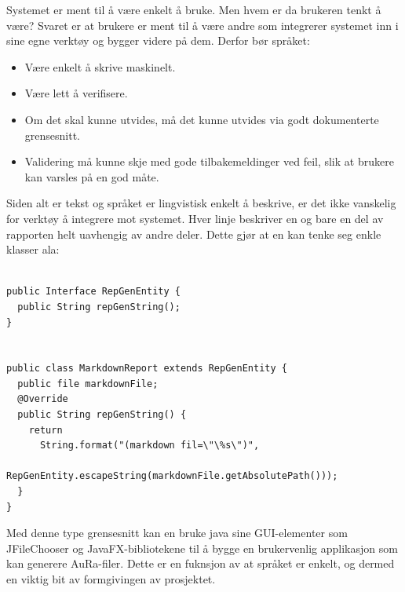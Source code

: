 \documentclass[norsk, 11pt, a4paper]{article}
\begin{document}
Systemet er ment til å være enkelt å bruke. Men hvem er da brukeren tenkt å være?
Svaret er at brukere er ment til å være andre som integrerer systemet inn i sine egne verktøy og bygger videre på dem.
Derfor bør språket:

\begin{itemize}
\item Være enkelt å skrive maskinelt.
\item Være lett å verifisere.
\item Om det skal kunne utvides, må det kunne utvides via godt dokumenterte grensesnitt.
\item Validering må kunne skje med gode tilbakemeldinger ved feil, slik at brukere kan varsles på en god måte.
\end{itemize}

Siden alt er tekst og språket er lingvistisk enkelt å beskrive, er det ikke vanskelig for verktøy å integrere mot systemet.
Hver linje beskriver en og bare en del av rapporten helt uavhengig av andre deler. Dette gjør at en kan tenke seg enkle klasser ala:


\lstset{language=Java}
\begin{lstlisting}

public Interface RepGenEntity {
  public String repGenString();
}


public class MarkdownReport extends RepGenEntity {
  public file markdownFile;
  @Override
  public String repGenString() {
    return 
      String.format("(markdown fil=\"\%s\")", 
                    RepGenEntity.escapeString(markdownFile.getAbsolutePath()));
  }
}
\end{lstlisting}

Med denne type grensesnitt kan en bruke java sine GUI-elementer som JFileChooser og JavaFX-bibliotekene til å bygge en brukervenlig applikasjon som kan generere AuRa-filer. Dette er en fuknsjon av at språket er enkelt, og dermed en viktig bit av formgivingen av prosjektet.
\end{document}
